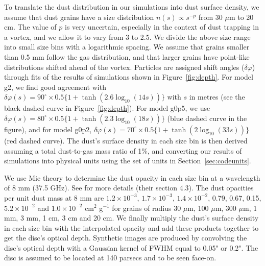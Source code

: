 \documentclass[a4paper,usenatbib]{mnras}
\begin{document}
To translate the dust distribution in our simulations into dust
surface density, we assume that dust grains have a size distribution
$n(s) \propto s^{-p}$ from 30 $\mu$m to 20 cm. The value of $p$ is
very uncertain, especially in the context of dust trapping in a
vortex, and we allow it to vary from 3 to 2.5. We divide the above
size range into small size bins with a logarithmic spacing. We assume
that grains smaller than 0.5 mm follow the gas distribution, and that
larger grains have point-like distributions shifted ahead of the
vortex. Particles are assigned shift angles ($\delta\varphi$) through
fits of the results of simulations shown in Figure~\ref{fig:depth}.
For model g2, we find good agreement with $\delta\varphi(s) =
90^{\circ} \times 0.5 \{1 + \tanh(2.6 \log_{10}(14s))\}$ with $s$ in
metres (see the black dashed curve in Figure~\ref{fig:depth}).  For
model g0p5, we use $\delta\varphi(s) = 80^{\circ}\times 0.5 \{1 +
\tanh(2.3 \log_{10}(18s))\}$ (blue dashed curve in the figure), and
for model g0p2, $\delta\varphi(s) = 70^{\circ} \times 0.5 \{1 +
\tanh(2 \log_{10}(33s))\}$ (red dashed curve). The dust's surface
density in each size bin is then derived assuming a total dust-to-gas
mass ratio of 1\%, and converting our results of simulations into
physical units using the set of units in Section~\ref{sec:codeunits}.

We use Mie theory to determine the dust opacity in each size bin at a
wavelength of 8 mm (37.5 GHz). See \cite{ZhuStone14} for more details
(their section 4.3). The dust opacities per unit dust mass at 8 mm are
$1.2\times10^{-3}$, $1.7\times10^{-3}$, $1.4\times10^{-2}$, 0.79,
0.67, 0.15, $5.2\times10^{-2}$ and $1.0\times10^{-2}$ cm$^2$ g$^{-1}$
for grains of radius 30 $\mu$m, 100 $\mu$m, 300 $\mu$m, 1 mm, 3 mm, 1
cm, 3 cm and 20 cm. We finally multiply the dust's surface density in
each size bin with the interpolated opacity and add these products
together to get the disc's optical depth. Synthetic images are
produced by convolving the disc's optical depth with a Gaussian kernel
of FWHM equal to 0.05" or 0.2". The disc is assumed to be located at
140 parsecs and to be seen face-on.
\end{document}
